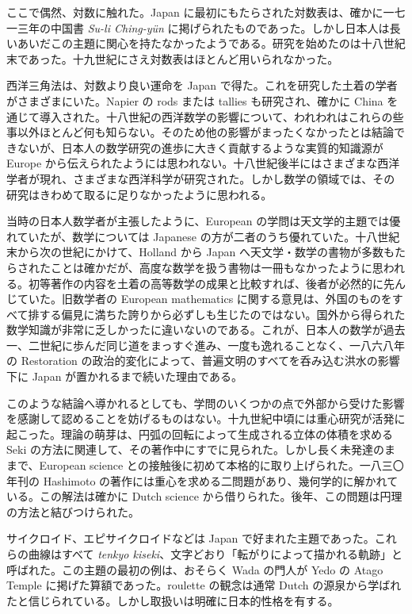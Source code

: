 \documentclass[11pt]{article}
\newcommand{\scanpage}[2]{\clearpage\setcounter{footnote}{0}\noindent{\footnotesize\color{gray}PDF #1 頁 · #2}\par\medskip}
\newcommand{\scanfooter}{}
\begin{document}
ここで偶然、対数に触れた。Japan に最初にもたらされた対数表は、確かに一七一三年の中国書 \emph{Su-li Ching-yün} に掲げられたものであった。しかし日本人は長いあいだこの主題に関心を持たなかったようである。研究を始めたのは十八世紀末であった。十九世紀にさえ対数表はほとんど用いられなかった。

西洋三角法は、対数より良い運命を Japan で得た。これを研究した土着の学者がさまざまにいた。Napier の rods または tallies も研究され、確かに China を通じて導入された。十八世紀の西洋数学の影響について、われわれはこれらの些事以外ほとんど何も知らない。そのため他の影響がまったくなかったとは結論できないが、日本人の数学研究の進歩に大きく貢献するような実質的知識源が Europe から伝えられたようには思われない。十八世紀後半にはさまざまな西洋学者が現れ、さまざまな西洋科学が研究された。しかし数学の領域では、その研究はきわめて取るに足りなかったように思われる。
\scanfooter

\scanpage{0189}{第22章、印刷頁175}
当時の日本人数学者が主張したように、European の学問は天文学的主題では優れていたが、数学については Japanese の方が二者のうち優れていた。十八世紀末から次の世紀にかけて、Holland から Japan へ天文学・数学の書物が多数もたらされたことは確かだが、高度な数学を扱う書物は一冊もなかったように思われる。初等著作の内容を土着の高等数学の成果と比較すれば、後者が必然的に先んじていた。旧数学者の European mathematics に関する意見は、外国のものをすべて排する偏見に満ちた誇りから必ずしも生じたのではない。国外から得られた数学知識が非常に乏しかったに違いないのである。これが、日本人の数学が過去一、二世紀に歩んだ同じ道をまっすぐ進み、一度も逸れることなく、一八六八年の Restoration の政治的変化によって、普遍文明のすべてを呑み込む洪水の影響下に Japan が置かれるまで続いた理由である。

このような結論へ導かれるとしても、学問のいくつかの点で外部から受けた影響を感謝して認めることを妨げるものはない。十九世紀中頃には重心研究が活発に起こった。理論の萌芽は、円弧の回転によって生成される立体の体積を求める Seki の方法に関連して、その著作中にすでに見られた。しかし長く未発達のままで、European science との接触後に初めて本格的に取り上げられた。一八三〇年刊の Hashimoto の著作には重心を求める二問題があり、幾何学的に解かれている。この解法は確かに Dutch science から借りられた。後年、この問題は円理の方法と結びつけられた。

サイクロイド、エピサイクロイドなどは Japan で好まれた主題であった。これらの曲線はすべて \emph{tenkyo kiseki}、文字どおり「転がりによって描かれる軌跡」と呼ばれた。この主題の最初の例は、おそらく Wada の門人が Yedo の Atago Temple に掲げた算額であった。roulette の観念は通常 Dutch の源泉から学ばれたと信じられている。しかし取扱いは明確に日本的性格を有する。
\end{document}
